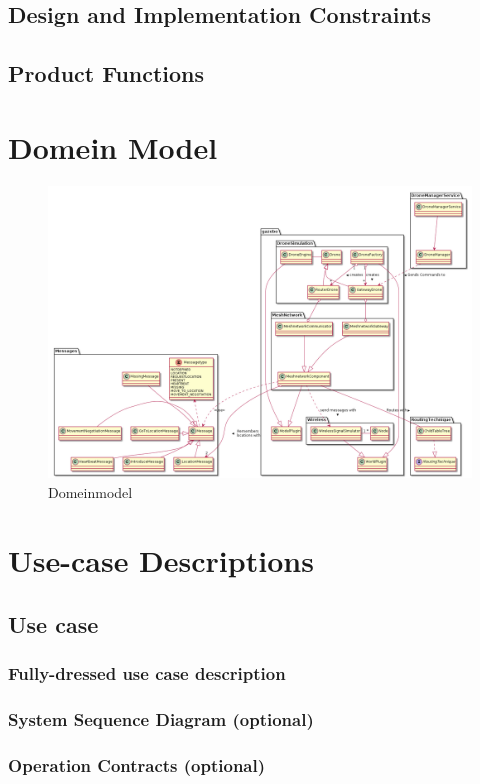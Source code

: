 \documentclass[a4paper, 11pt, oneside]{report}
\begin{document}
\section{Design and Implementation Constraints}
\section{Product Functions}
\chapter{Domein Model}
\begin{figure}[H]
	\begin{center}\includegraphics[width=\linewidth]{DomeinModel}\end{center}
	\caption{Domeinmodel}
	\label{fig:toplogienetwerkuml}
\end{figure}

\chapter{Use-case Descriptions}
\section{Use case}
\subsection{Fully-dressed use case description}
\subsection{System Sequence Diagram (optional)}
\subsection{Operation Contracts (optional)}
\end{document}

